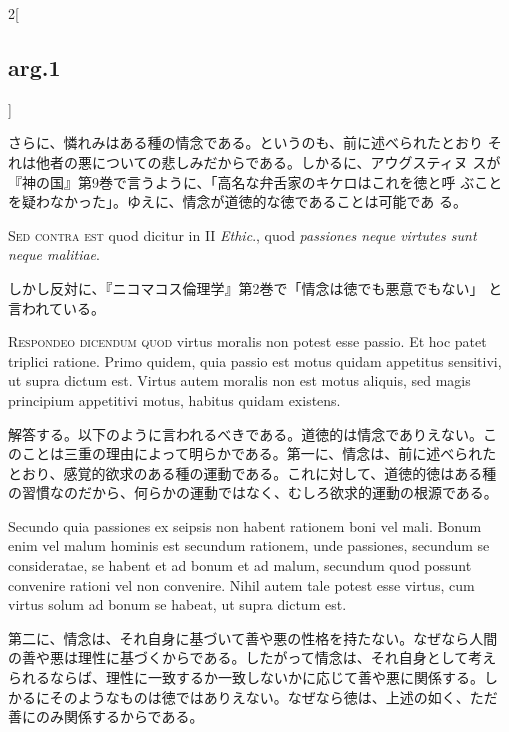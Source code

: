 \documentclass[paper=a4paper,fontsize=10pt,jafontsize=9pt,titlepage]{jlreq}
\begin{document}
\begin{paracol}{2}[\subsection{arg.1}]
\switchcolumn

さらに、憐れみはある種の情念である。というのも、前に述べられたとおり
 それは他者の悪についての悲しみだからである。しかるに、アウグスティヌ
 スが『神の国』第9巻で言うように、「高名な弁舌家のキケロはこれを徳と呼
 ぶことを疑わなかった」。ゆえに、情念が道徳的な徳であることは可能であ
 る。

\switchcolumn*[\subsection{s.c.}]

{\scshape Sed contra est} quod dicitur in II {\itshape Ethic}., quod
{\itshape passiones neque virtutes sunt neque malitiae}.

\switchcolumn

しかし反対に、『ニコマコス倫理学』第2巻で「情念は徳でも悪意でもない」
と言われている。


{\scshape Respondeo dicendum quod} virtus moralis non potest esse
passio. Et hoc patet triplici ratione. Primo quidem, quia passio est
motus quidam appetitus sensitivi, ut supra dictum est. Virtus autem
moralis non est motus aliquis, sed magis principium appetitivi motus,
habitus quidam existens.

\switchcolumn

解答する。以下のように言われるべきである。道徳的は情念でありえない。こ
のことは三重の理由によって明らかである。第一に、情念は、前に述べられた
とおり、感覚的欲求のある種の運動である。これに対して、道徳的徳はある種
の習慣なのだから、何らかの運動ではなく、むしろ欲求的運動の根源である。

\switchcolumn*

Secundo quia passiones ex seipsis non habent rationem boni vel
mali. Bonum enim vel malum hominis est secundum rationem, unde
passiones, secundum se consideratae, se habent et ad bonum et ad
malum, secundum quod possunt convenire rationi vel non
convenire. Nihil autem tale potest esse virtus, cum virtus solum ad
bonum se habeat, ut supra dictum est.

\switchcolumn

第二に、情念は、それ自身に基づいて善や悪の性格を持たない。なぜなら人間
の善や悪は理性に基づくからである。したがって情念は、それ自身として考え
られるならば、理性に一致するか一致しないかに応じて善や悪に関係する。し
かるにそのようなものは徳ではありえない。なぜなら徳は、上述の如く、ただ
善にのみ関係するからである。


\end{paracol}
\end{document}
